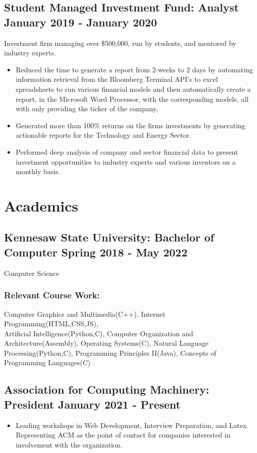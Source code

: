 \documentclass{article}
\begin{document}
\subsection{\large Student Managed Investment Fund: Analyst \hfill \small January 2019 - January 2020}
Investment firm managing over \$500,000, run by students, and mentored by industry experts.
\begin{itemize}
\setlength\itemsep{.1em}
	\item Reduced the time to generate a report from 2-weeks to 2 days by automating information retrieval from the Bloomberg Terminal API's to excel spreadsheets to run various financial models and then automatically create a report, in the Microsoft Word Processor, with the corresponding models, all with only providing the ticker of the company. 
	\item Generated more than 100\% returns on the firms investments by generating actionable reports for the Technology and Energy Sector.
	\item Performed deep analysis of company and sector financial data to present investment opportunities to industry experts and various inventors on a monthly basis. 
\end{itemize}
\section{Academics}
\subsection{\large Kennesaw State University: Bachelor of Computer  \hfill \small Spring 2018 - May 2022}
Computer Science
\subsubsection{Relevant Course Work:} Computer Graphics and Multimedia(C++), Internet Programming(HTML,CSS,JS),\\Artificial Intelligence(Python,C), Computer Organization and Architecture(Assembly), Operating Systems(C), Natural Language Processing(Python,C), Programming Principles II(Java), Concepts of Programming Languages(C)
\subsection{\large Association for Computing Machinery: President \hfill \small January 2021 - Present}
\begin{itemize}
\setlength\itemsep{.1em}
	\item  Leading workshops in Web Development, Interview Preparation, and Latex.  Representing ACM as the point of contact for companies interested in involvement with the organization. 
\end{itemize}
\end{document}
